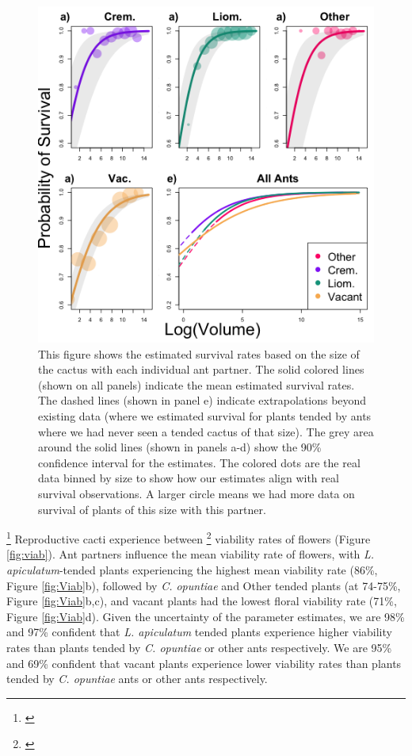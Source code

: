 \documentclass[11pt]{article}
\newcommand{\tom}[2]{{\color{red}{#1}}\footnote{\textit{\color{red}{#2}}}}
\begin{document}
\begin{figure}[H]
\includegraphics[width=0.95\linewidth]{Figures/SurvivalPlot.png}
\caption{This figure shows the estimated survival rates based on the size of the cactus with each individual ant partner. The solid colored lines (shown on all panels) indicate the mean estimated survival rates. The dashed lines (shown in panel e) indicate extrapolations beyond existing data (where we estimated survival for plants tended by ants where we had never seen a tended cactus of that size). The grey area around the solid lines (shown in panels a-d) show the 90\% confidence interval for the estimates. The colored dots are the real data binned by size to show how our estimates align with real survival observations. A larger circle means we had more data on survival of plants of this size with this partner.}
\label{fig:Surv}
\end{figure}

\tom{We found evidence that ant visitation leads to increased floral viability rates and that ant identity can influence the strength of viability benefits.}{Great example of an effective topic sentence for a Results paragraph. Sets the stage with the main result, and leaves the details for below.}
Reproductive cacti experience between \tom{39\% and 96\%}{Unclear what this range indicates. The min to max would be 0 to 100\%.} viability rates of flowers (Figure \ref{fig:viab}).
Ant partners influence the mean viability rate of flowers, with \textit{L. apiculatum}-tended plants experiencing the highest mean viability rate (86\%, Figure \ref{fig:Viab}b), followed by \textit{C. opuntiae} and Other tended plants (at 74-75\%, Figure \ref{fig:Viab}b,c), and vacant plants had the lowest floral viability rate (71\%, Figure \ref{fig:Viab}d).
Given the uncertainty of the parameter estimates, we are 98\% and 97\% confident that \textit{L. apiculatum} tended plants experience higher viability rates than plants tended by \textit{C. opuntiae} or other ants respectively.
We are 95\% and 69\% confident that vacant plants experience lower viability rates than plants tended by \textit{C. opuntiae} ants or other ants respectively.
\end{document}
